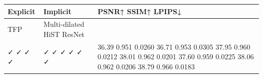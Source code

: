 \begin{tabular}{lll}
\toprule
Explicit & Implicit & PSNR↑ SSIM↑ LPIPS↓ \\
\midrule
TFP & Multi-dilated HiST ResNet &  \\
✓ ✓ ✓ ✓ & ✓ ✓ ✓ ✓ ✓ ✓ & 36.39 0.951 0.0260 36.71 0.953 0.0305 37.95 0.960 0.0212 38.01 0.962 0.0201 37.60 0.959 0.0225 38.06 0.962 0.0206 38.79 0.966 0.0183 \\
\bottomrule
\end{tabular}
